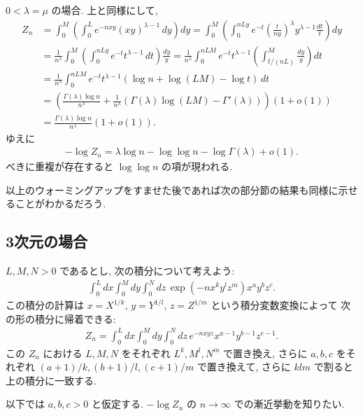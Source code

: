 \documentclass[12pt,twoside]{jarticle}
\theoremstyle{jplain}
\theoremstyle{jplain}
\theoremstyle{jplain}
\numberwithin{theorem}{section}
\numberwithin{equation}{section}
\numberwithin{figure}{section}
\numberwithin{table}{section}
\begin{document}
$0<\lambda=\mu$ の場合. 上と同様にして,
\begin{align*}
Z_n
&=\int_0^M \left(\int_0^L e^{-nxy} (xy)^{\lambda-1}\,dy\right)dy
=\int_0^M \left(\int_0^{nLy} e^{-t} \left(\frac{t}{ny}\right)^\lambda y^{\lambda-1}\frac{dt}{t}\right)dy
\\ &
=\frac{1}{n^\lambda}\int_0^M \left(\int_0^{nLy} e^{-t} t^{\lambda-1}\,dt\right)\frac{dy}{y}
=\frac{1}{n^\lambda}\int_0^{nLM} e^{-t} t^{\lambda-1} \left(\int_{t/(nL)}^{M}\frac{dy}{y}\right)dt
\\ &
=\frac{1}{n^\lambda}\int_0^{nLM} e^{-t} t^{\lambda-1}
\left(\log n + \log(LM) -\log t \right)\,dt
\\ &
=\left(
\frac{\Gamma(\lambda)\log n}{n^\lambda}
+\frac{1}{n^\lambda}
\left(\Gamma(\lambda)\log(LM)-\Gamma'(\lambda)\right)
\right)(1+o(1))
\\ &
=\frac{\Gamma(\lambda)\log n}{n^\lambda}(1+o(1)).
\end{align*}
ゆえに
\begin{align*}
-\log Z_n = \lambda\log n - \log\log n -\log\Gamma(\lambda)+o(1).
\end{align*}
べきに重複が存在すると $\log\log n$ の項が現われる.

以上のウォーミングアップをすませた後であれば次の部分節の結果も同様に示せることがわかるだろう.


\subsection{3次元の場合}
\label{sec:d=3}

$L,M,N>0$ であるとし, 次の積分について考えよう:
\begin{align*}
\int_0^L dx\int_0^M dy\int_0^N dz\, \exp\left(-n x^k y^l z^m \right) x^a y^b z^c.
\end{align*}
この積分の計算は $x=X^{1/k}$, $y=Y^{1/l}$, $z=Z^{1/m}$ という積分変数変換によって
次の形の積分に帰着できる:
\begin{align*}
Z_n = \int_0^L dx \int_0^M dy \int_0^N dz\,
e^{-nxyz}x^{a-1}y^{b-1}z^{c-1}.
\end{align*}
この $Z_n$ における $L,M,N$ をそれぞれ $L^k,M^l,N^m$ で置き換え, 
さらに $a,b,c$ をそれぞれ $(a+1)/k, (b+1)/l, (c+1)/m$ で置き換えて, 
さらに $klm$ で割ると上の積分に一致する.

以下では $a,b,c>0$ と仮定する.  $-\log Z_n$ の $n\to\infty$ での漸近挙動を知りたい.
\end{document}
